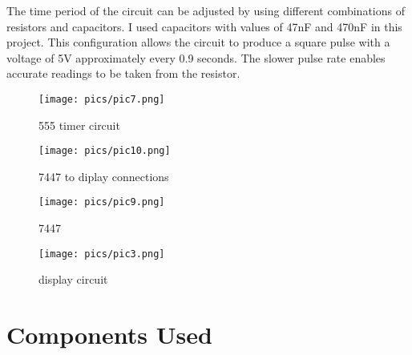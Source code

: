 \documentclass[journal,12pt,twocolumn]{IEEEtran}
\begin{document}
The time period of the circuit can be adjusted by using different combinations of resistors and capacitors. I used capacitors with values of 47nF and 470nF in this project. This configuration allows the circuit to produce a square pulse with a voltage of 5V approximately every 0.9 seconds. The slower pulse rate enables accurate readings to be taken from the resistor.

\begin{figure}[h]
    \centering
    \texttt{[image: pics/pic7.png]}
    \caption{555 timer circuit}
    \label{fig:Fig:2}
\end{figure}

\begin{figure}[h]
    \centering
    \texttt{[image: pics/pic10.png]}
    \caption{7447 to diplay connections}
    \label{fig:Fig:1}
\end{figure}   

\begin{figure}[h]
    \centering
    \texttt{[image: pics/pic9.png]}
    \caption{7447}
    \label{fig:Fig:1}
\end{figure}       

\begin{figure}[h]
    \centering
    \texttt{[image: pics/pic3.png]}
    \caption{display circuit}
    \label{fig:Fig:3}
\end{figure}



\section{Components Used}
\end{document}
